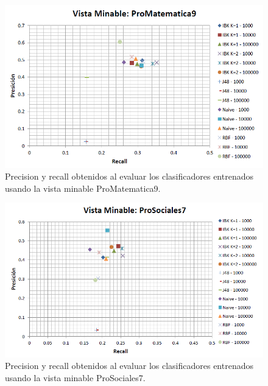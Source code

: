 \documentclass{article}
\begin{document}
\begin{figure}[!htb]
\begin{centering}
\includegraphics[scale=0.75]{promatematica9}
\par\end{centering}
\caption{Precision y recall obtenidos al evaluar los clasificadores entrenados usando la vista minable ProMatematica9.}
\label{fig:figura17}
\end{figure}
\clearpage
\begin{figure}[!htb]
\begin{centering}
\includegraphics[scale=0.7]{prosociales7}
\par\end{centering}
\caption{Precision y recall obtenidos al evaluar los clasificadores entrenados usando la vista minable ProSociales7.}
\label{fig:figura18}
\end{figure}
\end{document}
